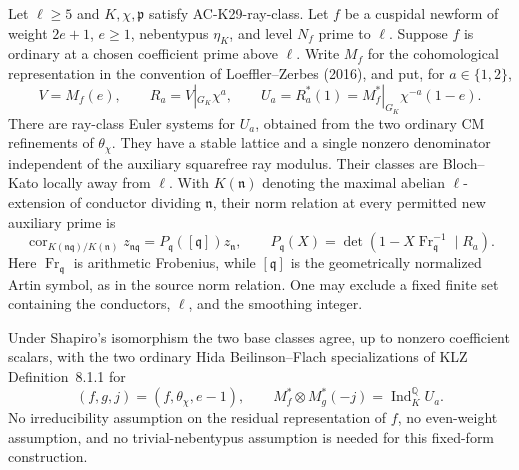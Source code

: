 \begin{proposition}
\label{AC-K29-ray}
Let $\ell\ge5$ and $K,\chi,\mathfrak p$ satisfy
AC-K29-ray-class.  Let $f$ be a cuspidal newform of weight
$2e+1$, $e\ge1$, nebentypus $\eta_K$, and level $N_f$
prime to $\ell$.  Suppose $f$ is ordinary at a chosen
coefficient prime above $\ell$.  Write $M_f$ for the
cohomological representation in the convention of
Loeffler--Zerbes (2016), and put, for $a\in\{1,2\}$,
\[
 V=M_f(e),\qquad R_a=V|_{G_K}\chi^a,
 \qquad U_a=R_a^*(1)=M_f^*|_{G_K}\chi^{-a}(1-e).
                                                            \tag{CER.2}
\]
There are ray-class Euler systems for $U_a$, obtained from
the two ordinary CM refinements of $\theta_\chi$.
They have a stable lattice and a single nonzero denominator
independent of the auxiliary squarefree ray modulus.
Their classes are Bloch--Kato locally away from $\ell$.
With $K(\mathfrak n)$ denoting the maximal abelian
$\ell$-extension of conductor dividing $\mathfrak n$, their
norm relation at every permitted new auxiliary prime is
\[
 \operatorname{cor}_{K(\mathfrak n\mathfrak q)/K(\mathfrak n)}
       z_{\mathfrak n\mathfrak q}
       =P_{\mathfrak q}([\mathfrak q])z_{\mathfrak n},
 \qquad
 P_{\mathfrak q}(X)
       =\det(1-X\operatorname{Fr}_{\mathfrak q}^{-1}\mid R_a).
                                                            \tag{CER.3}
\]
Here $\operatorname{Fr}_{\mathfrak q}$ is arithmetic
Frobenius, while $[\mathfrak q]$ is the geometrically
normalized Artin symbol, as in the source norm relation.
One may exclude a fixed finite set containing the conductors,
$\ell$, and the smoothing integer.

Under Shapiro's isomorphism the two base classes agree, up to
nonzero coefficient scalars, with the two ordinary Hida
Beilinson--Flach specializations of KLZ Definition~8.1.1 for
\[
  (f,g,j)=(f,\theta_\chi,e-1),\qquad
 M_f^*\otimes M_g^*(-j)=\operatorname{Ind}_K^{\mathbb Q}U_a.
                                                            \tag{CER.4}
\]
No irreducibility assumption on the residual representation
of $f$, no even-weight assumption, and no trivial-nebentypus
assumption is needed for this fixed-form construction.
\end{proposition}
